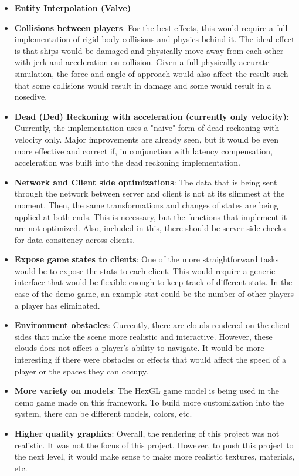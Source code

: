 \documentclass{acmsiggraph}
\begin{document}
\begin{itemize}
    \item{\textbf{Entity Interpolation (Valve)}}
    \item{\textbf{Collisions between players}: For the best effects, this would require a full implementation of rigid body collisions and physics behind it. The ideal effect is that ships would be damaged and physically move away from each other with jerk and acceleration on collision. Given a full physically accurate simulation, the force and angle of approach would also affect the result such that some collisions would result in damage and some would result in a nosedive.}
    \item{\textbf{Dead (Ded) Reckoning with acceleration (currently only velocity)}: Currently, the implementation uses a "naive" form of dead reckoning with velocity only. Major improvements are already seen, but it would be even more effective and correct if, in conjunction with latency compensation, acceleration was built into the dead reckoning implementation.}
    \item{\textbf{Network and Client side optimizations}: The data that is being sent through the network between server and client is not at its slimmest at the moment. Then, the same transformations and changes of states are being applied at both ends. This is necessary, but the functions that implement it are not optimized. Also, included in this, there should be server side checks for data consitency across clients.}
    \item{\textbf{Expose game states to clients}: One of the more straightforward tasks would be to expose the stats to each client. This would require a generic interface that would be flexible enough to keep track of different stats. In the case of the demo game, an example stat could be the number of other players a player has eliminated.}
    \item{\textbf{Environment obstacles}: Currently, there are clouds rendered on the client sides that make the scene more realistic and interactive. However, these clouds does not affect a player's ability to navigate. It would be more interesting if there were obstacles or effects that would affect the speed of a player or the spaces they can occupy.}
    \item{\textbf{More variety on models}: The HexGL game model is being used in the demo game made on this framework. To build more customization into the system, there can be different models, colors, etc.}
    \item{\textbf{Higher quality graphics}: Overall, the rendering of this project was not realistic. It was not the focus of this project. However, to push this project to the next level, it would make sense to make more realistic textures, materials, etc.}
\end{itemize}
\end{document}

